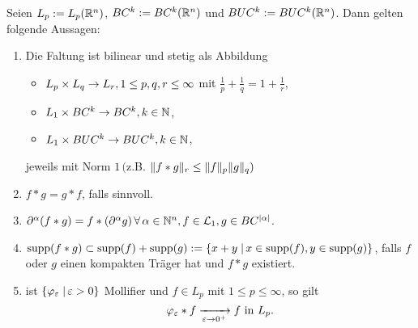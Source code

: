 \begin{satz}
  \label{satz:3.3}
  Seien $L_p:=L_p(\mathbb{R}^n)$, $BC^k:=BC^k(\mathbb{R}^n)$ und $BUC^k:=BUC^k(\mathbb{R}^n)$. Dann gelten folgende Aussagen:
  
  \begin{enumerate}[\rm(i)]
  \item \label{satz:3.3-1} Die Faltung ist bilinear und stetig als Abbildung
    \begin{itemize}
    \item $L_p\times L_q\rightarrow L_r ,1\leq p,q,r\leq\infty$ mit $\frac 1p+\frac 1q=1+\frac 1r$,
    \item $L_1\times BC^k\rightarrow BC^k, k\in\mathbb{N}$,
    \item $L_1\times BUC^k\rightarrow BUC^k, k\in\mathbb{N}$,
    \end{itemize}
    jeweils mit Norm $1\, ($z.B. $\lVert f\ast g\rVert_r\leq\lVert f\rVert_p\lVert g\rVert_q)$

  \item $f\ast g=g\ast f$, falls sinnvoll.
  \item $\partial^\alpha(f\ast g)=f\ast(\partial^\alpha g)\,\forall\,\alpha\in\mathbb{N}^n, f\in\mathcal{L}_1, g\in BC^{\lvert \alpha\rvert}$.
  \item \label{satz:3.3-4} $\operatorname{supp}(f\ast g)\subset\operatorname{supp}(f)+\operatorname{supp}(g):=\{x+y\;\vert\, x\in\operatorname{supp}(f),y\in\operatorname{supp}(g)\}$, falls $f$ oder $g$ einen kompakten Träger hat und $f\ast g$ existiert.
  \item \label{satz:3.3-5} ist $\{\varphi_\varepsilon\;\vert\, \varepsilon>0\}$ Mollifier und $f\in L_p$ mit $1\leq p\leq\infty$, so gilt
    \[
    \varphi_\varepsilon\ast f\xrightarrow[\varepsilon\rightarrow 0^+]{}f\text{ in }L_p.
    \]
  \end{enumerate}
\end{satz}

